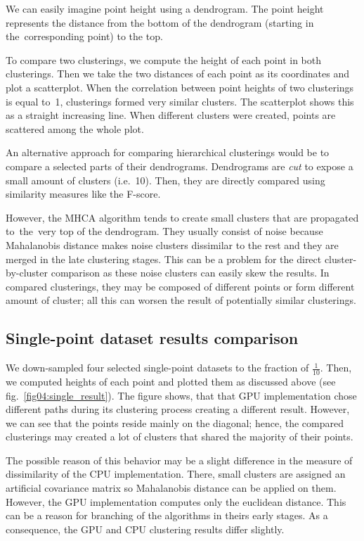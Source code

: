 We can easily imagine point height using a dendrogram. The point height represents the distance from the bottom of the dendrogram (starting in the~corresponding point) to the top.

To compare two clusterings, we compute the height of each point in both clusterings. Then we take the two distances of each point as its coordinates and plot a scatterplot. When the correlation between point heights of two clusterings is equal to~1, clusterings formed very similar clusters. The scatterplot shows this as a straight increasing line. When different clusters were created, points are scattered among the whole plot.

An alternative approach for comparing hierarchical clusterings would be to compare a selected parts of their dendrograms. Dendrograms are \emph{cut} to expose a small amount of clusters (i.e.~10). Then, they are directly compared using similarity measures like the F-score.

However, the MHCA algorithm tends to create small clusters that are propagated to~the~very top of the dendrogram. They usually consist of noise because Mahalanobis distance makes noise clusters dissimilar to the rest and they are merged in the late clustering stages. This can be a problem for the direct cluster-by-cluster comparison as these noise clusters can easily skew the results. In compared clusterings, they may be composed of different points or form different amount of cluster; all this can worsen the result of potentially similar clusterings. 

\subsection{Single-point dataset results comparison}

We down-sampled four selected single-point datasets to the fraction of $\frac{1}{10}$. Then, we computed heights of each point and plotted them as discussed above (see fig.~\ref{fig04:single_result}). The figure shows, that that GPU implementation chose different paths during its clustering process creating a different result. However, we can see that the points reside mainly on the diagonal; hence, the compared clusterings may created a lot of clusters that shared the majority of their points.

The possible reason of this behavior may be a slight difference in the measure of dissimilarity of the CPU implementation. There, small clusters are assigned an artificial covariance matrix so Mahalanobis distance can be applied on them. However, the GPU implementation computes only the euclidean distance. This can be a reason for branching of the algorithms in theirs early stages. As a consequence, the GPU and CPU clustering results differ slightly.

